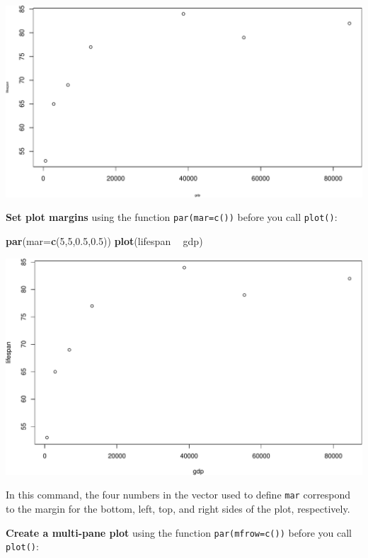 \documentclass[
]{book}
\newenvironment{Shaded}{\begin{snugshade}}{\end{snugshade}}
\newcommand{\DataTypeTok}[1]{\textcolor[rgb]{0.13,0.29,0.53}{#1}}
\newcommand{\DecValTok}[1]{\textcolor[rgb]{0.00,0.00,0.81}{#1}}
\newcommand{\FloatTok}[1]{\textcolor[rgb]{0.00,0.00,0.81}{#1}}
\newcommand{\KeywordTok}[1]{\textcolor[rgb]{0.13,0.29,0.53}{\textbf{#1}}}
\newcommand{\NormalTok}[1]{#1}
\newcommand{\OperatorTok}[1]{\textcolor[rgb]{0.81,0.36,0.00}{\textbf{#1}}}
\newcommand{\StringTok}[1]{\textcolor[rgb]{0.31,0.60,0.02}{#1}}
\begin{document}
\includegraphics{figures/unnamed-chunk-233-1.pdf}

\textbf{Set plot margins} using the function \texttt{par(mar=c())} before you call \texttt{plot()}:

\begin{Shaded}
\begin{Highlighting}[]
\KeywordTok{par}\NormalTok{(}\DataTypeTok{mar=}\KeywordTok{c}\NormalTok{(}\DecValTok{5}\NormalTok{,}\DecValTok{5}\NormalTok{,}\FloatTok{0.5}\NormalTok{,}\FloatTok{0.5}\NormalTok{))}
\KeywordTok{plot}\NormalTok{(lifespan }\OperatorTok{~}\StringTok{ }\NormalTok{gdp)}
\end{Highlighting}
\end{Shaded}

\includegraphics{figures/unnamed-chunk-234-1.pdf}

In this command, the four numbers in the vector used to define \texttt{mar} correspond to the margin for the bottom, left, top, and right sides of the plot, respectively.

\textbf{Create a multi-pane plot} using the function \texttt{par(mfrow=c())} before you call \texttt{plot()}:
\end{document}
